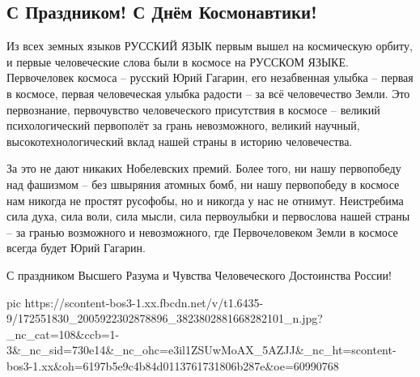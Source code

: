  
 
 
 
 

\subsection{С Праздником! С Днём Космонавтики!}

Из всех земных языков РУССКИЙ ЯЗЫК первым вышел на космическую орбиту, и первые
человеческие слова были в космосе на РУССКОМ ЯЗЫКЕ. Первочеловек космоса –
русский Юрий Гагарин, его незабвенная улыбка – первая в космосе, первая
человеческая улыбка радости – за всё человечество Земли. Это первознание,
первочувство человеческого присутствия в космосе – великий психологический
первополёт за грань невозможного, великий научный, высокотехнологический вклад
нашей страны в историю человечества.

За это не дают никаких Нобелевских премий. Более того, ни нашу первопобеду над
фашизмом – без швыряния атомных бомб, ни нашу первопобеду в космосе нам никогда
не простят русофобы, но и никогда у нас не отнимут. Неистребима сила духа, сила
воли, сила мысли, сила первоулыбки и первослова нашей страны – за гранью
возможного и невозможного, где Первочеловеком Земли в космосе всегда будет Юрий
Гагарин.

С праздником Высшего Разума и Чувства Человеческого Достоинства России!

\ifcmt
  pic https://scontent-bos3-1.xx.fbcdn.net/v/t1.6435-9/172551830_2005922302878896_3823802881668282101_n.jpg?_nc_cat=108&ccb=1-3&_nc_sid=730e14&_nc_ohc=e3il1ZSUwMoAX_5AZJJ&_nc_ht=scontent-bos3-1.xx&oh=6197b5e9c4b84d0113761731806b287e&oe=60990768
\fi

